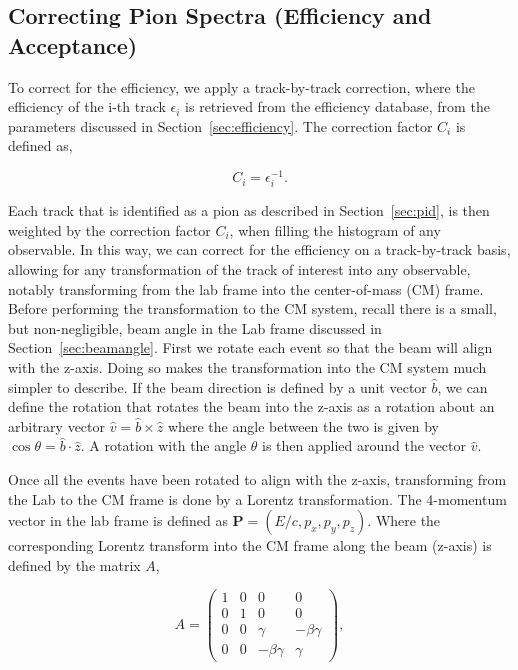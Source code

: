 \subsection{Correcting Pion Spectra (Efficiency and Acceptance)}
\label{sec:corrSpectra}
To correct for the efficiency, we apply a track-by-track correction, where the efficiency of the i-th track $\epsilon_i$ is retrieved from the efficiency database, from the parameters discussed in Section~\ref{sec:efficiency}. The correction factor $C_i$ is defined as,

\begin{equation}
C_i = \epsilon_i^{-1}.
\label{eq:effCorrFactor}
\end{equation}

Each track that is identified as a pion as described in Section~\ref{sec:pid}, is then weighted by the correction factor $C_i$, when filling the histogram of any observable. In this way, we can correct for the efficiency on a track-by-track basis, allowing for any transformation of the track of interest into any observable, notably transforming from the lab frame into the center-of-mass (CM) frame. Before performing the transformation to the CM system, recall there is a small, but non-negligible, beam angle in the Lab frame discussed in Section~\ref{sec:beamangle}. First we rotate each event so that the beam will align with the z-axis. Doing so makes the transformation into the CM system much simpler to describe. If the beam direction is defined by a unit vector $\hat{b}$, we can define the rotation that rotates the beam into the z-axis as a rotation about an arbitrary vector $\hat{v} = \hat{b}\times\hat{z}$ where the angle between the two is given by $\cos \theta = \hat{b}\cdot\hat{z}$. A rotation with the angle $\theta$ is then applied around the vector $\hat{v}$.

Once all the events have been rotated to align with the z-axis, transforming from the Lab to the CM frame is done by a Lorentz transformation. The 4-momentum vector in the lab frame is defined as $\textbf{P} = (E/c,p_x,p_y,p_z)$. Where the corresponding Lorentz transform into the CM frame along the beam (z-axis) is defined by the matrix $A$,

\begin{equation}
A = \begin{pmatrix}
1 & 0 & 0 & 0\\
0 & 1 & 0 & 0\\
0 & 0 & \gamma & -\beta \gamma\\
0 & 0 & -\beta \gamma & \gamma
\end{pmatrix},
\end{equation}

